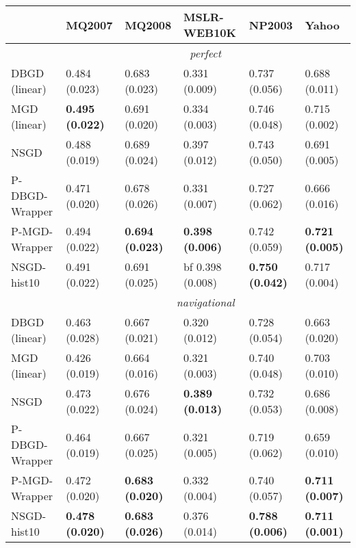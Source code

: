 \begin{tabular*}{\textwidth}{@{\extracolsep{\fill} } l  l l l l l  }
\toprule
 & { \small \textbf{MQ2007}}  & { \small \textbf{MQ2008}}  & { \small \textbf{MSLR-WEB10K}}  & { \small \textbf{NP2003}}  & { \small \textbf{Yahoo}} \\
\midrule
& \multicolumn{5}{|c|}{\textit{perfect}} \\
\midrule
DBGD (linear) & 0.484 {\tiny (0.023)} & 0.683 {\tiny (0.023)} & 0.331 {\tiny (0.009)} & 0.737 {\tiny (0.056)} & 0.688 {\tiny (0.011)} \\
MGD (linear) & \bf 0.495 {\tiny (0.022)} & 0.691 {\tiny (0.020)} & 0.334 {\tiny (0.003)} & 0.746 {\tiny (0.048)} & 0.715 {\tiny (0.002)} \\
NSGD & 0.488 {\tiny (0.019)} & 0.689 {\tiny (0.024)} & 0.397 {\tiny (0.012)}  & 0.743 {\tiny (0.050)} & 0.691 {\tiny (0.005)} \\
P-DBGD-Wrapper & 0.471 {\tiny (0.020)}  & 0.678 {\tiny (0.026)}  & 0.331 {\tiny (0.007)}  & 0.727 {\tiny (0.062)}  & 0.666 {\tiny (0.016)}  \\
P-MGD-Wrapper & 0.494 {\tiny (0.022)}  & \bf 0.694 {\tiny (0.023)}  & \bf 0.398 {\tiny (0.006)}  & 0.742 {\tiny (0.059)}  & \bf 0.721 {\tiny (0.005)} \\
NSGD-hist10 & 0.491 {\tiny (0.022)}  & 0.691 {\tiny (0.025)}  & bf 0.398 {\tiny (0.008)} & \bf 0.750 {\tiny (0.042)}  & 0.717 {\tiny (0.004)} \\
\midrule
& \multicolumn{5}{|c|}{\textit{navigational}} \\
\midrule
DBGD (linear) & 0.463 {\tiny (0.028)} & 0.667 {\tiny (0.021)} & 0.320 {\tiny (0.012)} & 0.728 {\tiny (0.054)} & 0.663 {\tiny (0.020)} \\
MGD (linear) & 0.426 {\tiny (0.019)} & 0.664 {\tiny (0.016)} & 0.321 {\tiny (0.003)} & 0.740 {\tiny (0.048)} & 0.703 {\tiny (0.010)} \\
NSGD & 0.473 {\tiny (0.022)} & 0.676 {\tiny (0.024)} & \bf 0.389 {\tiny (0.013)} & 0.732 {\tiny (0.053)} & 0.686 {\tiny (0.008)} \\
P-DBGD-Wrapper & 0.464 {\tiny (0.019)}  & 0.667 {\tiny (0.025)}  & 0.321 {\tiny (0.005)}  & 0.719 {\tiny (0.062)}  & 0.659 {\tiny (0.010)}  \\
P-MGD-Wrapper & 0.472 {\tiny (0.020)}  & \bf 0.683 {\tiny (0.020)}  & 0.332 {\tiny (0.004)}  & 0.740 {\tiny (0.057)}  & \bf 0.711 {\tiny (0.007)}  \\
NSGD-hist10 & \bf 0.478 {\tiny (0.020)}  & \bf 0.683 {\tiny (0.026)}  & 0.376 {\tiny (0.014)} & \bf 0.788 {\tiny (0.006)}  & \bf 0.711 {\tiny (0.001)} \\

\end{tabular*}
